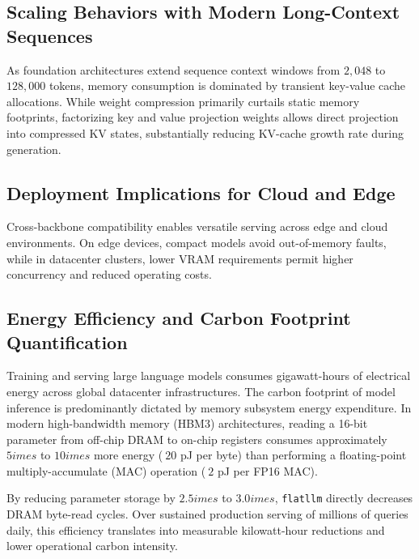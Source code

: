 \subsection{Scaling Behaviors with Modern Long-Context Sequences}
As foundation architectures extend sequence context windows from $2{,}048$ to $128{,}000$ tokens, memory consumption is dominated by transient key-value cache allocations. While weight compression primarily curtails static memory footprints, factorizing key and value projection weights allows direct projection into compressed KV states, substantially reducing KV-cache growth rate during generation.

\subsection{Deployment Implications for Cloud and Edge}
Cross-backbone compatibility enables versatile serving across edge and cloud environments. On edge devices, compact models avoid out-of-memory faults, while in datacenter clusters, lower VRAM requirements permit higher concurrency and reduced operating costs.

\subsection{Energy Efficiency and Carbon Footprint Quantification}
Training and serving large language models consumes gigawatt-hours of electrical energy across global datacenter infrastructures. The carbon footprint of model inference is predominantly dictated by memory subsystem energy expenditure. In modern high-bandwidth memory (HBM3) architectures, reading a 16-bit parameter from off-chip DRAM to on-chip registers consumes approximately $5	imes$ to $10	imes$ more energy ($~20$ pJ per byte) than performing a floating-point multiply-accumulate (MAC) operation ($~2$ pJ per FP16 MAC).

By reducing parameter storage by $2.5	imes$ to $3.0	imes$, \texttt{flatllm} directly decreases DRAM byte-read cycles. Over sustained production serving of millions of queries daily, this efficiency translates into measurable kilowatt-hour reductions and lower operational carbon intensity.
